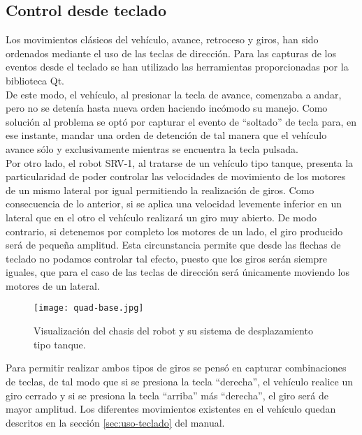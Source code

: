 \subsection{Control desde teclado}

Los movimientos clásicos del vehículo, avance, retroceso y giros, han sido ordenados mediante el uso de las teclas de dirección. Para las capturas de los eventos desde el teclado se han utilizado las herramientas proporcionadas por la biblioteca Qt.\\

De este modo, el vehículo, al presionar la tecla de avance, comenzaba a andar, pero no se detenía hasta nueva orden haciendo incómodo su manejo. Como solución al problema se optó por capturar el evento de ``soltado'' de tecla para, en ese instante, mandar una orden de detención de tal manera que el vehículo avance sólo y exclusivamente mientras se encuentra la tecla pulsada.\\

Por otro lado, el robot SRV-1, al tratarse de un vehículo tipo tanque, presenta la particularidad de poder controlar las velocidades de movimiento de los motores de un mismo lateral por igual permitiendo la realización de giros. Como consecuencia de lo anterior, si se aplica una velocidad levemente inferior en un lateral que en el otro el vehículo realizará un giro muy abierto. De modo contrario, si detenemos por completo los motores de un lado, el giro producido será de pequeña amplitud. Esta circunstancia permite que desde las flechas de teclado no podamos controlar tal efecto, puesto que los giros serán siempre iguales, que para el caso de las teclas de dirección será únicamente moviendo los motores de un lateral.\\

\begin{figure}[H]
  \begin{center}
    \texttt{[image: quad-base.jpg]}
  \end{center}
  \caption{Visualización del chasis del robot y su sistema de desplazamiento tipo tanque.}
  \label{fig:quad-base}
\end{figure}

 Para permitir realizar ambos tipos de giros se pensó en capturar combinaciones de teclas, de tal modo que si se presiona la tecla ``derecha'', el vehículo realice un giro cerrado y si se presiona la tecla ``arriba'' más ``derecha'', el giro será de mayor amplitud. Los diferentes movimientos existentes en el vehículo quedan descritos en la sección \ref{sec:uso-teclado} del manual.\\

